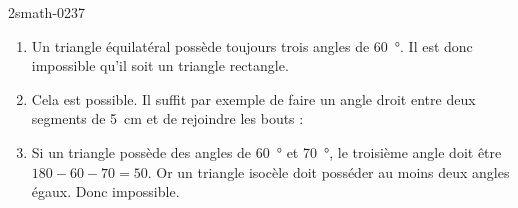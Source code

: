
\begin{corrige}{2smath-0237}

    \begin{enumerate}
        \item
            Un triangle équilatéral possède toujours trois angles de \SI{60}{\degree}. Il est donc impossible qu'il soit un triangle rectangle.
        \item
            Cela est possible. Il suffit par exemple de faire un angle droit entre deux segments de \SI{5}{\centi\meter} et de rejoindre les bouts :



\begin{center}
   
\end{center}

\item
     
    Si un triangle possède des angles de \SI{60}{\degree} et \SI{70}{\degree}, le troisième angle doit être \( 180-60-70=50\). Or un triangle isocèle doit posséder au moins deux angles égaux. Donc impossible.

    \end{enumerate}

\end{corrige}
